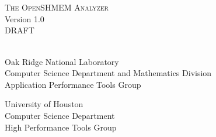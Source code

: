 \begin{titlepage}
  \begin{center}

    \vspace{1.0in} ~ \\

    \HRule \\[0.1in]
    {\LARGE \textsc{The OpenSHMEM Analyzer}} \\
    \vspace{0.2in}
    {\LARGE Version 1.0} \\
    \vspace{0.2in}
    {\LARGE DRAFT} \\
    \HRule \\[0.5in]

    \vspace{1.0in}

    Oak Ridge National Laboratory \\
    Computer Science Department and Mathematics Division \\
    Application Performance Tools Group \\

    \vspace{0.4in}

    University of Houston \\
    Computer Science Department \\
    High Performance Tools Group

  \end{center}
\end{titlepage}
